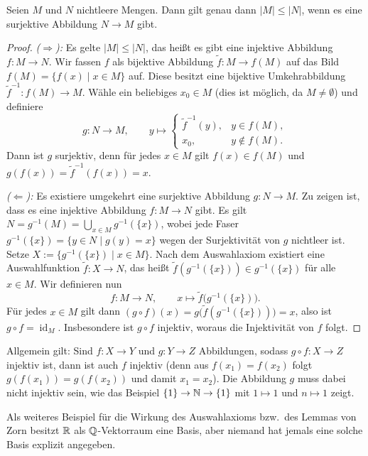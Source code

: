 \begin{satz}
Seien $M$ und $N$ nichtleere Mengen. Dann gilt genau dann $|M|\le|N|$,
wenn es eine surjektive Abbildung $N\to M$ gibt.
\end{satz}
\begin{proof}
\emph{($\Rightarrow$):} Es gelte $|M|\le|N|$, das heißt es gibt eine
injektive Abbildung $f:M\to N$. Wir fassen $f$ als bijektive Abbildung
$\widetilde f:M\to f(M)$ auf das Bild $f(M)=\{f(x)\mid x\in M\}$ auf.
Diese besitzt eine bijektive Umkehrabbildung $\widetilde f^{-1}:f(M)\to M$.
Wähle ein beliebiges $x_0\in M$ (dies ist möglich, da $M\ne\emptyset$)
und definiere
\[
    g:N\longrightarrow M,\qquad
    y\longmapsto\begin{cases}
        \widetilde f^{-1}(y), & y\in f(M),\\
        x_0, & y\notin f(M).
    \end{cases}
\]
Dann ist $g$ surjektiv, denn für jedes $x\in M$ gilt $f(x)\in f(M)$ und
$g(f(x))=\widetilde f^{-1}(f(x))=x$.

\medskip
\noindent\emph{($\Leftarrow$):} Es existiere umgekehrt eine surjektive
Abbildung $g:N\to M$. Zu zeigen ist, dass es eine injektive Abbildung
$f:M\to N$ gibt.
Es gilt $N=g^{-1}(M)=\bigcup_{x\in M}g^{-1}(\{x\})$, wobei jede Faser
$g^{-1}(\{x\})=\{y\in N\mid g(y)=x\}$ wegen der Surjektivität von $g$
nichtleer ist. Setze $X:=\{g^{-1}(\{x\})\mid x\in M\}$.
Nach dem Auswahlaxiom existiert eine Auswahlfunktion $\widetilde f:X\to N$,
das heißt $\widetilde f(g^{-1}(\{x\}))\in g^{-1}(\{x\})$ für alle $x\in M$.
Wir definieren nun
\[
    f:M\longrightarrow N,\qquad x\longmapsto\widetilde f\bigl(g^{-1}(\{x\})\bigr).
\]
Für jedes $x\in M$ gilt dann
$(g\circ f)(x)=g\bigl(\widetilde f(g^{-1}(\{x\}))\bigr)=x$, also ist
$g\circ f=\operatorname{id}_M$. Insbesondere ist $g\circ f$ injektiv,
woraus die Injektivität von $f$ folgt.
\end{proof}

\begin{bemerkung}
Allgemein gilt: Sind $f:X\to Y$ und $g:Y\to Z$ Abbildungen, sodass
$g\circ f:X\to Z$ injektiv ist, dann ist auch $f$ injektiv (denn aus
$f(x_1)=f(x_2)$ folgt $g(f(x_1))=g(f(x_2))$ und damit $x_1=x_2$).
Die Abbildung $g$ muss dabei nicht injektiv sein, wie das Beispiel
$\{1\}\to\mathbb{N}\to\{1\}$ mit $1\mapsto1$ und $n\mapsto1$ zeigt.
\end{bemerkung}

\begin{bemerkung}
Als weiteres Beispiel für die Wirkung des Auswahlaxioms bzw.\ des Lemmas
von Zorn besitzt $\mathbb{R}$ als $\mathbb{Q}$-Vektorraum eine Basis, aber niemand hat
jemals eine solche Basis explizit angegeben.
\end{bemerkung}

